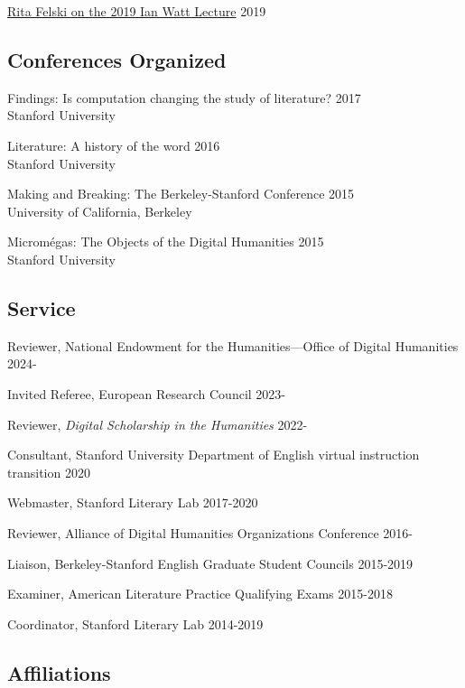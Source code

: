 \documentclass[
  12pt,
  letterpaper,
]{article}
\begin{document}
\href{https://web.archive.org/web/20220429093144/https://novel.stanford.edu/csn-cafe/2021/7/23/rita-felski-on-her-2019-ian-watt-lecture-5319}{Rita
Felski on the 2019 Ian Watt Lecture} \hfill 2019

\hypertarget{conferences-organized}{%
\subsection{Conferences Organized}\label{conferences-organized}}

Findings: Is computation changing the study of literature? \hfill 2017\\
Stanford University

Literature: A history of the word \hfill 2016\\
Stanford University

Making and Breaking: The Berkeley-Stanford Conference \hfill 2015\\
University of California, Berkeley

Micromégas: The Objects of the Digital Humanities \hfill 2015\\
Stanford University

\hypertarget{service}{%
\subsection{Service}\label{service}}

Reviewer, National Endowment for the Humanities—Office of Digital Humanities \hfill 2024-

Invited Referee, European Research Council \hfill 2023-

Reviewer, \emph{Digital Scholarship in the Humanities} \hfill 2022-

Consultant, Stanford University Department of English virtual
instruction transition \hfill 2020

Webmaster, Stanford Literary Lab \hfill 2017-2020

Reviewer, Alliance of Digital Humanities Organizations Conference
\hfill 2016-

Liaison, Berkeley-Stanford English Graduate Student Councils
\hfill 2015-2019

Examiner, American Literature Practice Qualifying Exams \hfill 2015-2018

Coordinator, Stanford Literary Lab \hfill 2014-2019

\hypertarget{affiliations}{%
\subsection{Affiliations}\label{affiliations}}
\end{document}
